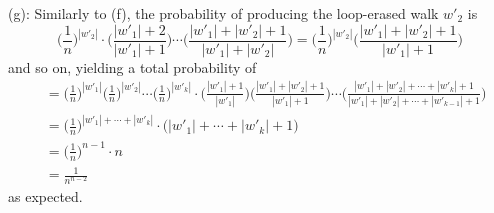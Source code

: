 \documentclass{amsart}
\begin{document}
	(g): Similarly to (f), the probability of producing the loop-erased walk $w'_2$ is 
	$$
	\Big(\frac{1}{n}\Big)^{|w'_2|} \cdot \bigg(\frac{|w'_1|+2}{|w'_1|+1}\bigg) \cdots\bigg( \frac{|w'_1|+|w'_2|+1}{|w'_1|+|w'_2|}\bigg) = \Big(\frac{1}{n}\Big)^{|w'_2|} \bigg(\frac{|w'_1|+|w'_2|+1}{|w'_1|+1}\bigg)
	$$
	and so on, yielding a total probability of
	\begin{align*}
	&= \Big(\frac{1}{n}\Big)^{|w'_1|}\Big(\frac{1}{n}\Big)^{|w'_2|} \cdots \Big(\frac{1}{n}\Big)^{|w'_k|} \cdot \bigg(\frac{|w'_1|+1}{|w'_1|}\bigg)   \bigg(\frac{|w'_1|+|w'_2|+1}{|w'_1|+1}\bigg) \cdots \bigg(\frac{|w'_1| + |w'_2| + \cdots + |w'_k|+1}{|w'_1| + |w'_2| + \cdots + |w'_{k-1}| + 1}\bigg) \\
	&= \Big(\frac{1}{n}\Big)^{|w'_1|+\cdots+|w'_k|} \cdot \Big(|w'_1| + \cdots + |w'_k| + 1\Big)\\
	&= \Big(\frac{1}{n}\Big)^{n-1} \cdot n\\
	&= \frac{1}{n^{n-2}}
	\end{align*}
	as expected.
\end{document}
